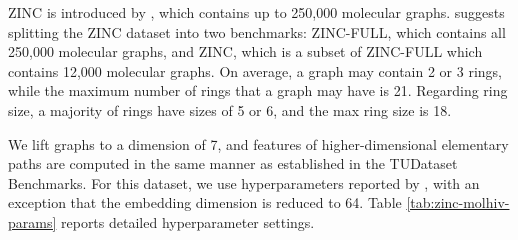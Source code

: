 \documentclass[letterpaper]{article} \usepackage{aaai24}  \usepackage{times}  \usepackage{helvet}  \usepackage{courier}  \usepackage[hyphens]{url}  \usepackage{graphicx} \urlstyle{rm} \def\UrlFont{\rm}  \usepackage{natbib}  \usepackage{caption} \frenchspacing  \setlength{\pdfpagewidth}{8.5in} \setlength{\pdfpageheight}{11in} \usepackage{algorithm}
\begin{document}
ZINC is introduced by \cite{sterling_zinc15_2015}, which contains up to 250,000 molecular graphs. \cite{dwivedi_benchmarkgnns_2020} suggests splitting the ZINC dataset into two benchmarks: ZINC-FULL, which contains all 250,000 molecular graphs, and ZINC, which is a subset of ZINC-FULL which contains 12,000 molecular graphs. On average, a graph may contain 2 or 3 rings, while the maximum number of rings that a graph may have is 21. Regarding ring size, a majority of rings have sizes of 5 or 6, and the max ring size is 18.

We lift graphs to a dimension of 7, and features of higher-dimensional elementary paths are computed in the same manner as established in the TUDataset Benchmarks. For this dataset, we use hyperparameters reported by \cite{bodnar_weisfeiler_2022}, with an exception that the embedding dimension is reduced to 64. Table \ref{tab:zinc-molhiv-params} reports detailed hyperparameter settings.
\begin{table}[t]
\centering
{}
\caption{Two different runs on the ZINC dataset with the number of message-passing layers of 6. Bold text indicates the performance that deviates from the rest.}
\label{tab:zinc-uncertainty}
\end{table}
\end{document}
